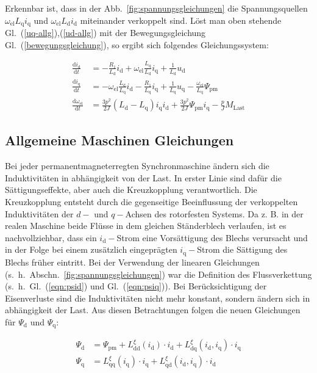 \documentclass[conference,twocolumn]{IEEEtran}
\newcommand{\x}[1]{\mathrm{#1}}
\begin{document}
Erkennbar ist, dass in der Abb.~\ref{fig:spannungsgleichungen} die Spannungsquellen $\omega_\x{el} L_\x{q} i_\x{q}$ und $\omega_\x{el} L_\x{d} i_\x{d}$ miteinander verkoppelt sind.
Löst man oben stehende Gl.~(\ref{uq-allg}),(\ref{ud-allg}) mit der Bewegungsgleichung Gl.~(\ref{bewegungsgleichung}), so ergibt sich folgendes Gleichungssystem:

\begin{align}
\frac{\x{d}i_\x{d}}{\x{d}t} &= -\frac{R_\x{1}}{L_\x{d}}i_\x{d}+\omega_\x{el}\frac{L_\x{q}}{L_\x{d}}i_\x{q}+\frac{1}{L_\x{d}}u_\x{d} \\
\frac{\x{d}i_\x{q}}{\x{d}t} &= -\omega_\x{el}\frac{L_\x{d}}{L_\x{q}}i_\x{d} - \frac{R_\x{1}}{L_\x{q}}i_\x{q} + \frac{1}{L_\x{q}}u_\x{q} - \frac{\omega_\x{el}}{L_\x{q}}\Psi_\x{pm} \\
\frac{\x{d}\omega_\x{el}}{\x{d}t} &= \frac{3p^2}{2J}(L_\x{d} - L_\x{q})i_\x{q} i_\x{d} + \frac{3p^2}{2J} \Psi_\x{pm} i_\x{q} - \frac{p}{J} M_\x{Last}
\end{align}

\subsection{Allgemeine Maschinen Gleichungen}\label{sec:allg-gleichungen}

Bei jeder permanentmagneterregten Synchronmaschine ändern sich die Induktivitäten in abhängigkeit von der Last.
In erster Linie sind dafür die Sättigungseffekte, aber auch die Kreuzkopplung verantwortlich.
Die Kreuzkopplung entsteht durch die gegenseitige Beeinflussung der verkoppelten Induktivitäten der $d-$ und $q-$Achsen des rotorfesten Systems.
Da z. B. in der realen Maschine beide Flüsse in dem gleichen Ständerblech verlaufen, ist es nachvollziehbar, dass ein $i_\x{d}-$Strom eine Vorsättigung des Blechs verursacht und in der Folge bei einem zusätzlich eingeprägten $i_\x{q}-$Strom die Sättigung des Blechs früher eintritt.
Bei der Verwendung der linearen Gleichungen (s.~h.~Abschn.~\ref{fig:spannungsgleichungen}) war die Definition des Flussverkettung (s.~h.~Gl.~(\ref{eqn:psid}) und Gl.~(\ref{eqn:psiq})).
Bei Berücksichtigung der Eisenverluste sind die Induktivitäten nicht mehr konstant, sondern ändern sich in abhängigkeit der Last.
Aus diesen Betrachtungen folgen die neuen Gleichungen für $\Psi_\x{d}$ und $\Psi_\x{q}$:

\begin{align}
\Psi_\x{d} &= \Psi_\x{pm} + L_\x{dd}^{\xi}(i_\x{d})\cdot i_\x{d} + L_\x{dq}^{\xi}(i_\x{d} ,i_\x{q})\cdot i_\x{q} \\
\Psi_\x{q} &= L_\x{qq}^{\xi}(i_\x{q})\cdot i_\x{q} + L_\x{qd}^{\xi}(i_\x{d} ,i_\x{q})\cdot i_\x{d}
\end{align}
\end{document}
